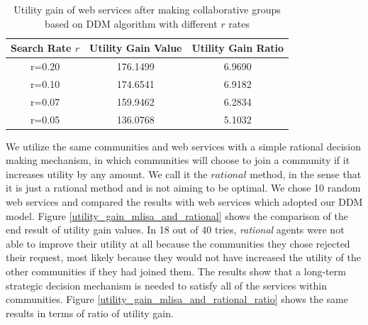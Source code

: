 \begin{table}[ht]
\caption{Utility gain of web services after making collaborative groups based on DDM algorithm with different $r$ rates} %
\centering %
{\renewcommand{\arraystretch}{1.2}
\begin{tabular}{c|c|c} %
\hline\hline %
Search Rate $r$ & Utility Gain Value & Utility Gain Ratio \\ [0.5ex] %
\hline %
r=0.20 & 176.1499 & 6.9690 \\
r=0.10 & 174.6541 & 6.9182 \\
r=0.07 & 159.9462 & 6.2834 \\
r=0.05 & 136.0768 & 5.1032 \\ [1ex] %
\hline %
\end{tabular}
}
\label{table:valueandgain} %
\end{table}


%

We utilize the same communities and web services with a simple rational decision making mechanism, in which communities will choose to join a community if it increases utility by any amount. We call it the $rational$ method, in the sense that it is just a rational method and is not aiming to be optimal. We chose 10 random web services and compared the results with web services which adopted our DDM model. Figure \ref{utility_gain_mlisa_and_rational} shows the comparison of the end result of utility gain values. In 18 out of 40 tries, \emph{rational} agents were not able to improve their utility at all because the communities they chose rejected their request, most likely because they would not have increased the utility of the other communities if they had joined them. The results show that a long-term strategic decision mechanism is needed to satisfy all of the services within communities. Figure \ref{utility_gain_mlisa_and_rational_ratio} shows the same results in terms of ratio of utility gain.

